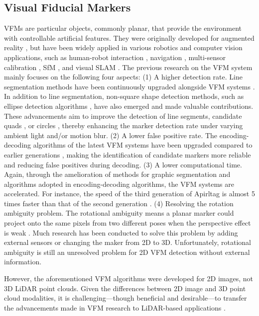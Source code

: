 \subsection{Visual Fiducial Markers}
VFMs \cite{wang,olson,ap3,aruco,cctag,arc,arc2} are particular objects, commonly planar, that provide the environment with controllable artificial features. They were originally developed for augmented reality \cite{ar}, but have been widely applied in various robotics and computer vision applications, such as human-robot interaction \cite{wang,olson}, navigation \cite{yibo1,yibo2,liao}, multi-sensor calibration \cite{kalibr,lt2}, SfM \cite{munoz,qingdao}, and visual SLAM \cite{munoz2019,shuo,shuo2}. The previous research on the VFM system mainly focuses on the following four aspects: (1) A higher detection rate. Line segmentation methods have been continuously upgraded alongside VFM systems \cite{olson,wang}. In addition to line segmentation, non-square shape detection methods, such as ellipse detection algorithms \cite{arc,arc2,cctag}, have also emerged and made valuable contributions. These advancements aim to improve the detection of line segments, candidate quads \cite{ap3,aruco}, or circles \cite{arc,arc2,cctag}, thereby enhancing the marker detection rate under varying ambient light and/or motion blur. (2) A lower false positive rate. The encoding-decoding algorithms of the latest VFM systems \cite{ap3,aruco} have been upgraded compared to earlier generations \cite{wang,olson}, making the identification of candidate markers more reliable and reducing false positives during decoding. (3) A lower computational time. Again, through the amelioration of methods for graphic segmentation and algorithms adopted in encoding-decoding algorithms, the VFM systems are accelerated. For instance, the speed of the third generation of Apirltag \cite{ap3} is almost 5 times faster than that of the second generation \cite{wang}. (4) Resolving the rotation ambiguity problem. The rotational ambiguity means a planar marker could project onto the same pixels from two different poses when the perspective effect is weak \cite{ippe}. Much research \cite{yibo,ch2020} has been conducted to solve this problem by adding external sensors or changing the maker from 2D to 3D. Unfortunately, rotational ambiguity is still an unresolved problem for 2D VFM detection without external information.
\par
However, the aforementioned VFM algorithms were developed for 2D images, not 3D LiDAR point clouds. Given the differences between 2D image and 3D point cloud modalities, it is challenging—though beneficial and desirable—to transfer the advancements made in VFM research to LiDAR-based applications \cite{lt}.
%
